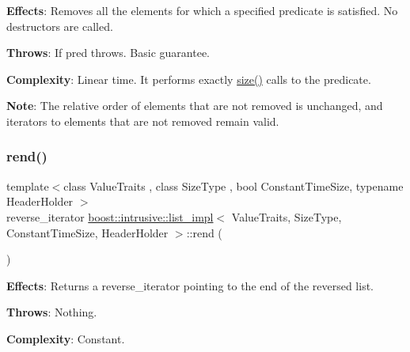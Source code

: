 {\bfseries Effects}\+: Removes all the elements for which a specified predicate is satisfied. No destructors are called.

{\bfseries Throws}\+: If pred throws. Basic guarantee.

{\bfseries Complexity}\+: Linear time. It performs exactly \hyperlink{classboost_1_1intrusive_1_1list__impl_a9da0074a31566f3a7dbc3cd1a2d752c1}{size()} calls to the predicate.

{\bfseries Note}\+: The relative order of elements that are not removed is unchanged, and iterators to elements that are not removed remain valid. \mbox{\label{classboost_1_1intrusive_1_1list__impl_a4e8cb800394865d8a46cf83510b2dfbd}} 
\subsubsection{\texorpdfstring{rend()}{rend()}\hspace{0.1cm}{\footnotesize\ttfamily [1/2]}}
{\footnotesize\ttfamily template$<$class Value\+Traits , class Size\+Type , bool Constant\+Time\+Size, typename Header\+Holder $>$ \\
reverse\+\_\+iterator \hyperlink{classboost_1_1intrusive_1_1list__impl}{boost\+::intrusive\+::list\+\_\+impl}$<$ Value\+Traits, Size\+Type, Constant\+Time\+Size, Header\+Holder $>$\+::rend (\begin{DoxyParamCaption}{ }\end{DoxyParamCaption})\hspace{0.3cm}{\ttfamily [inline]}}

{\bfseries Effects}\+: Returns a reverse\+\_\+iterator pointing to the end of the reversed list.

{\bfseries Throws}\+: Nothing.

{\bfseries Complexity}\+: Constant. \mbox{\label{classboost_1_1intrusive_1_1list__impl_a0be73e24a3891a9ca9391c9762e5cc72}} 
